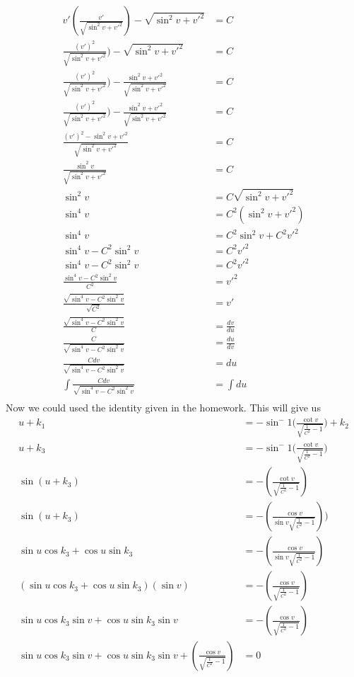 \begin{equation}
\begin{aligned}
v'(\frac{v'}{\sqrt{\sin^2 v + v'^2}}) - \sqrt{\sin^2 v + v'^2} &= C\\
\frac{(v')^2}{\sqrt{\sin^2 v + v'^2}}) - \sqrt{\sin^2 v + v'^2} &= C\\
\frac{(v')^2}{\sqrt{\sin^2 v + v'^2}}) - \frac{\sin^2 v + v'^2}{\sqrt{\sin^2 v + v'^2}} &= C\\
\frac{(v')^2}{\sqrt{\sin^2 v + v'^2}}) - \frac{\sin^2 v + v'^2}{\sqrt{\sin^2 v + v'^2}} &= C\\
\frac{(v')^2 - \sin^2 v + v'^2}{\sqrt{\sin^2 v + v'^2}} &= C\\
\frac{\sin^2 v}{\sqrt{\sin^2 v + v'^2}} &= C\\
\sin^2 v &= C \sqrt{\sin^2 v + v'^2}\\
\sin^4 v &= C^2 (\sin^2 v + v'^2)\\
\sin^4 v &= C^2 \sin^2 v + C^2 v'^2\\
\sin^4 v - C^2 \sin^2 v &= C^2 v'^2\\
\sin^4 v - C^2 \sin^2 v &= C^2 v'^2\\
\frac{\sin^4 v - C^2 \sin^2 v}{C^2} &= v'^2\\
\frac{\sqrt{\sin^4 v - C^2 \sin^2 v}}{\sqrt{C^2}} &= v'\\
\frac{\sqrt{\sin^4 v - C^2 \sin^2 v}}{C} &= \frac{dv}{du}\\
\frac{C}{\sqrt{\sin^4 v - C^2 \sin^2 v}} &= \frac{du}{dv}\\
\frac{C dv}{\sqrt{\sin^4 v - C^2 \sin^2 v}} &= du\\
\int \frac{C dv}{\sqrt{\sin^4 v - C^2 \sin^2 v}} &= \int du\\
\end{aligned}
\end{equation}
Now we could used the identity given in the homework. This will give us
\begin{equation}
\begin{aligned}
u + k_1&= -\sin^-1 {(\frac{\cot v}{\sqrt{\frac{1}{C^2}-1}}}) + k_2\\
u + k_3 &= -\sin^-1 {(\frac{\cot v}{\sqrt{\frac{1}{C^2}-1}}})\\
\sin (u + k_3) &= -(\frac{\cot v}{\sqrt{\frac{1}{C^2} - 1}})\\
 \sin (u + k_3) &= -(\frac{\cos v}{ \sin v \sqrt{\frac{1}{C^2}-1}}))\\
\sin u \cos k_3 + \cos u \sin k_3 &= -(\frac{\cos v}{ \sin v \sqrt{\frac{1}{C^2}-1}})\\
(\sin u \cos k_3 + \cos u \sin k_3)(\sin v) &= -(\frac{\cos v}{\sqrt{\frac{1}{C^2}-1}})\\
\sin u \cos k_3 \sin v + \cos u \sin k_3 \sin v &= -(\frac{\cos v}{\sqrt{\frac{1}{C^2}-1}})\\
\sin u \cos k_3 \sin v + \cos u \sin k_3 \sin v + (\frac{\cos v}{\sqrt{\frac{1}{C^2}-1}}) &= 0
\end{aligned}
\end{equation}
